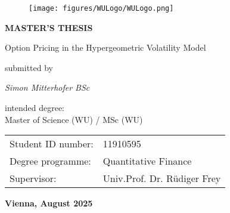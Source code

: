 \documentclass[a4paper,11pt]{article}
\begin{document}

\thispagestyle{empty}
\begin{figure}[h!]
    \raggedleft
    \texttt{[image: figures/WULogo/WULogo.png]}
\end{figure}


\begin{center}
    \textbf{\huge MASTER’S THESIS} \\
    \vspace{1.5cm}

    \LARGE Option Pricing in the Hypergeometric Volatility Model \\
    \vspace{2.5cm}
    
    \normalsize submitted by \\
    \vspace{0.5cm}
    
    \textit{\Large Simon Mitterhofer BSc}
    \vspace{2cm}
    
    intended degree: \\
    \Large Master of Science (WU) / MSc (WU)
        \\
\vspace{1cm}
\normalsize

    \begin{tabular}{ll}
        Student ID number: & 11910595 \\
        Degree programme: & Quantitative Finance \\
        Supervisor: & Univ.Prof. Dr. Rüdiger Frey \\
    \end{tabular}
    \vspace{2cm}
    
    \textbf{Vienna, August 2025}
\end{center}

\newpage


\tableofcontents








\appendix



\end{document}
